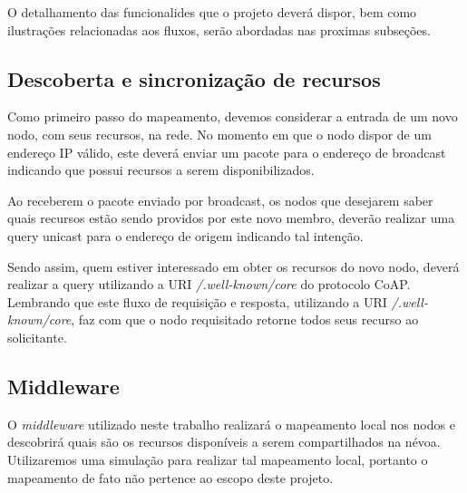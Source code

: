 O detalhamento das funcionalides que o projeto deverá dispor, bem como ilustrações relacionadas aos fluxos, serão abordadas nas proximas subseções.



\subsection{Descoberta e sincronização de recursos}



Como primeiro passo do mapeamento, devemos considerar a entrada de um novo nodo, com seus recursos, na rede.
No momento em que o nodo dispor de um endereço IP válido, este deverá enviar um pacote para o endereço de broadcast indicando que possui recursos a serem disponibilizados.

Ao receberem o pacote enviado por broadcast, os nodos que desejarem saber quais recursos estão sendo providos por este novo membro, deverão realizar uma query
unicast para o endereço de origem indicando tal intenção.

Sendo assim, quem estiver interessado em obter os recursos do novo nodo, deverá realizar a query utilizando a URI \textit{/.well-known/core} do protocolo CoAP.
Lembrando que este fluxo de requisição e resposta, utilizando a URI \textit{/.well-known/core}, faz com que o nodo requisitado retorne todos seus recurso ao solicitante.


\subsection{Middleware}


O \textit{middleware} utilizado neste trabalho realizará o mapeamento local nos nodos e descobrirá quais são os recursos disponíveis a serem compartilhados na névoa.
Utilizaremos uma simulação para realizar tal mapeamento local, portanto o mapeamento de fato não pertence ao escopo deste projeto.




